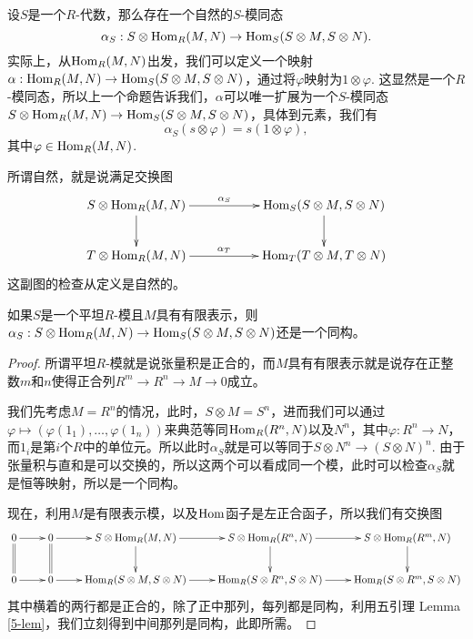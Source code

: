 设$S$是一个$R$-代数，那么存在一个自然的$S$-模同态
\[
	\alpha_S:S\otimes\operatorname{Hom}_R(M,N)\to \operatorname{Hom}_S(S\otimes M,S\otimes N).
\]
实际上，从$\operatorname{Hom}_R(M,N)$出发，我们可以定义一个映射$\alpha:\operatorname{Hom}_R(M,N)\to \operatorname{Hom}_S(S\otimes M,S\otimes N)$，通过将$\varphi$映射为$1\otimes \varphi$. 这显然是一个$R$-模同态，所以上一个命题告诉我们，$\alpha$可以唯一扩展为一个$S$-模同态$S\otimes\operatorname{Hom}_R(M,N)\to \operatorname{Hom}_S(S\otimes M,S\otimes N)$，具体到元素，我们有
\[
	\alpha_S(s\otimes \varphi)=s(1\otimes \varphi),
\]
其中$\varphi\in \operatorname{Hom}_R(M,N)$.

所谓自然，就是说满足交换图
\[
\begin{xy}
	\xymatrix
	{
		S\otimes\Hom_R(M,N)\ar[rr]^-{\alpha_S}\ar[d]&&\Hom_S(S\otimes M,S\otimes N)\ar[d]\\
		T\otimes\Hom_R(M,N)\ar[rr]^-{\alpha_T}&&\Hom_T(T\otimes M,T\otimes N)
	}
\end{xy}
\]
这副图的检查从定义是自然的。

\begin{pro}\label{3.5.5}
	如果$S$是一个平坦$R$-模且$M$具有有限表示，则$\alpha_S:S\otimes\operatorname{Hom}_R(M,N)\to \operatorname{Hom}_S(S\otimes M,S\otimes N)$还是一个同构。
\end{pro}

\begin{proof}
	所谓平坦$R$-模就是说张量积是正合的，而$M$具有有限表示就是说存在正整数$m$和$n$使得正合列$R^m\to R^n \to M\to 0$成立。

	我们先考虑$M=R^n$的情况，此时，$S\otimes M=S^n$，进而我们可以通过$\varphi\mapsto (\varphi(1_1),\dots,\varphi(1_n))$来典范等同$\operatorname{Hom}_R(R^n,N)$以及$N^n$，其中$\varphi:R^n\to N$，而$1_i$是第$i$个$R$中的单位元。所以此时$\alpha_S$就是可以等同于$S\otimes N^n\to (S\otimes N)^n$. 由于张量积与直和是可以交换的，所以这两个可以看成同一个模，此时可以检查$\alpha_S$就是恒等映射，所以是一个同构。

	现在，利用$M$是有限表示模，以及$\operatorname{Hom}$函子是左正合函子，所以我们有交换图
	\[
	\begin{xy}
		\xymatrix{
			0\ar[r]\ar@{=}[d]&0\ar[r]\ar@{=}[d]&S\otimes \Hom_R(M,N)\ar[r]\ar[d]&S\otimes \Hom_R(R^n,N)\ar[r]\ar[d]&S\otimes \Hom_R(R^m,N)\ar[d]\\
			0\ar[r]&0\ar[r]&\Hom_R(S\otimes M,S\otimes N)\ar[r]&\Hom_R(S\otimes R^n,S\otimes N)\ar[r]&\Hom_R(S\otimes R^m,S\otimes N)
		}
	\end{xy}
	\]
	其中横着的两行都是正合的，除了正中那列，每列都是同构，利用五引理 Lemma \ref{5-lem}，我们立刻得到中间那列是同构，此即所需。
\end{proof}

